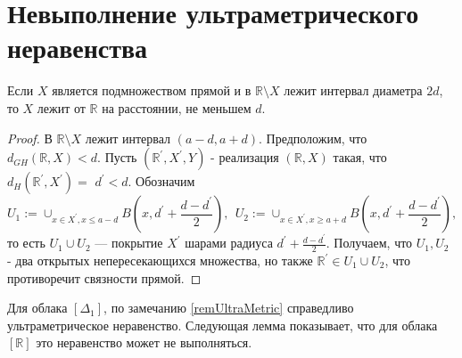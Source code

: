 \documentclass[11pt,twoside,draft
]{article}
\begin{document}
\section{Невыполнение ультраметрического неравенства}
\begin{lemma}
	Если $X$ является подмножеством прямой и в $\mathbb{R}\setminus X$ лежит интервал диаметра $2d$, 
	то $X$ лежит от $\mathbb{R}$ на расстоянии, не меньшем $d$.
	\label{lemmaDiamDist}
\end{lemma}
\begin{proof}В $\mathbb{R} \setminus X$ лежит интервал $(a-d, a+d)$. Предположим, что $d_{G H}(\mathbb{R}, X)<d$. Пусть $\left(\mathbb{R}^{\prime}, X^{\prime}, Y\right)$ - реализация $(\mathbb{R}, X)$ такая, что $d_H\left(\mathbb{R}^{\prime}, X^{\prime}\right)=$ $d^{\prime}<d$. Обозначим \[U_1:=\cup_{x \in X^{\prime}, x \leqslant a-d} B\left(x, d^{\prime}+\frac{d-d^{\prime}}{2}\right),~~ U_2:=\cup_{x \in X^{\prime}, x \geqslant a+d} B\left(x, d^{\prime}+\frac{d-d^{\prime}}{2}\right),\] 
	то есть $U_1 \cup U_2$ --- покрытие $X^{\prime}$ шарами радиуса
	$d^\prime + \frac{d-d^{\prime}}{2}$.
	Получаем, что $U_1, U_2$ - два открытых непересекающихся множества, но также $\mathbb{R}^{\prime} \in U_1 \cup U_2$, что противоречит связности прямой.
\end{proof}
Для облака $[\Delta_{1}]$, по замечанию \ref{remUltraMetric} справедливо
ультраметрическое неравенство.
Следующая лемма показывает, что для облака $[\mathbb{R}]$
это неравенство может не выполняться.
\end{document}
